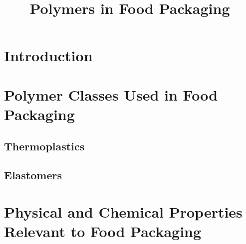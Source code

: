 \documentclass[11pt,a4paper]{article}
\title{Polymers in Food Packaging}
\begin{document}
\maketitle

\section{Introduction}

\section{Polymer Classes Used in Food Packaging}

\subsection{Thermoplastics}

\subsection{Elastomers}

\section{Physical and Chemical Properties Relevant to Food Packaging}
\end{document}
